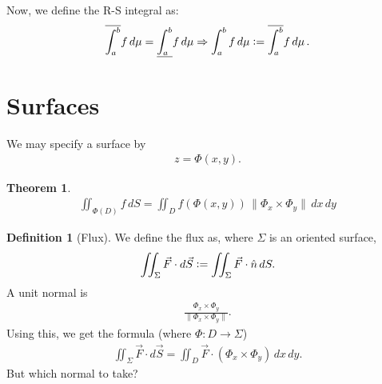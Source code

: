 \documentclass{article}
\newcommand{\vc}{\vcentcolon}
\theoremstyle{definition}
\newtheorem{thm}{Theorem}[subsubsection]
\newtheorem{defn}{Definition}[subsubsection]
\begin{document}
Now, we define the R-S integral as:
\begin{align*}
	\overline{\int_a^b} f\,d\mu=\underline{\int_a^b} f\,d\mu\Rightarrow \int_a^b f\,d\mu\vc=\overline{\int_a^b} f\,d\mu\,.
\end{align*}

\section{Surfaces}
We may specify a surface by
\begin{align*}
	z=\Phi(x,y).
\end{align*}
\begin{thm}
	\begin{align*}
		\iint_{\Phi(D)}f\,dS=\iint_Df(\Phi(x,y))\,\lVert\Phi_x\times\Phi_y\rVert\,dx\,dy
	\end{align*}
\end{thm}
\begin{defn}[Flux]
	We define the flux as, where $\Sigma$ is an oriented surface,
	\begin{align*}
		\iint_\Sigma\vec F\cdot d\vec S\vc=\iint_\Sigma\vec F\cdot\hat{n}\,dS.
	\end{align*}
	A unit normal is
	\begin{align*}
		\frac{\Phi_x\times\Phi_y}{\lVert\Phi_x\times\Phi_y\rVert}.
	\end{align*}
	Using this, we get the formula (where $\Phi:D\rightarrow\Sigma$)
	\begin{align*}
		\iint_\Sigma\vec F\cdot d\vec S=\iint_D\vec F\cdot(\Phi_x\times\Phi_y)\,dx\,dy.
	\end{align*}
	But which normal to take?
\end{defn}
\end{document}
